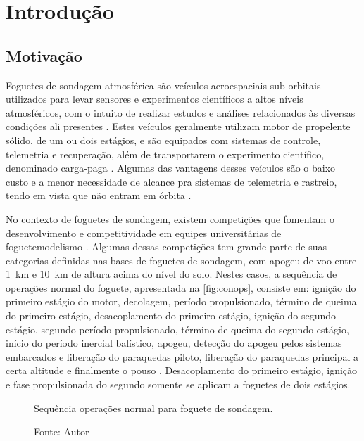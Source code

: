 \chapter{Introdução}

\section{Motivação}



Foguetes de sondagem atmosférica são veículos aeroespaciais sub-orbitais utilizados para levar sensores e experimentos científicos a altos níveis atmosféricos, com o intuito de realizar estudos e análises relacionados às diversas condições ali presentes \cite{isro}.
Estes veículos geralmente utilizam motor de propelente sólido, de um ou dois estágios, e são equipados com sistemas de controle, telemetria e recuperação, além de transportarem o experimento científico, denominado carga-paga \cite{esa, sabbatini2014esa}.
Algumas das vantagens desses veículos são o baixo custo e a menor necessidade de alcance pra sistemas de telemetria e rastreio, tendo em vista que não entram em órbita \cite{nasa}.

No contexto de foguetes de sondagem, existem competições que fomentam o desenvolvimento e competitividade em equipes universitárias de foguetemodelismo \cite{esra}.
Algumas dessas competições tem grande parte de suas categorias definidas nas bases de foguetes de sondagem, com apogeu de voo entre \SI{1}{\kilo\metre} e \SI{10}{\kilo\metre} de altura acima do nível do solo.
Nestes casos, a sequência de operações normal do foguete, apresentada na \autoref{fig:conops}, consiste em: ignição do primeiro estágio do motor, decolagem, período propulsionado, término de queima do primeiro estágio, desacoplamento do primeiro estágio, ignição do segundo estágio, segundo período propulsionado, término de queima do segundo estágio, início do período inercial balístico, apogeu, detecção do apogeu pelos sistemas embarcados e liberação do paraquedas piloto, liberação do paraquedas principal a certa altitude e finalmente o pouso \cite{esa, sabbatini2014esa}.
Desacoplamento do primeiro estágio, ignição e fase propulsionada do segundo somente se aplicam a foguetes de dois estágios.

\begin{figure}[h]
    \centering
    \caption{Sequência operações normal para foguete de sondagem.}
    
    \caption*{Fonte: Autor}
    \label{fig:conops}
\end{figure}

